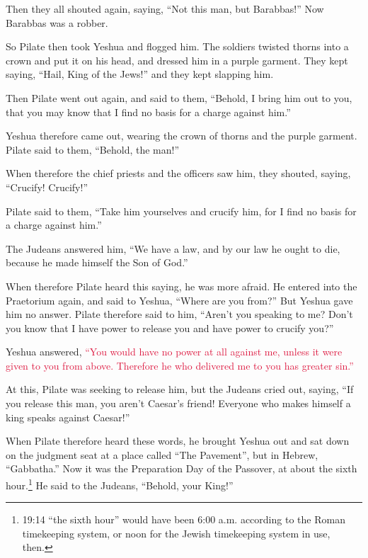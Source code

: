 \myverse{}Then they all shouted again, saying, “Not this man, but Barabbas!”
Now Barabbas was a robber.



 \myverse*{}So Pilate then took Yeshua and flogged him.
\myverse{}The soldiers twisted thorns into a crown and put it on his head, and dressed
him in a purple garment.
\myverse{}They kept saying, “Hail, King of the Jews!” and they kept slapping him.

\myverse{}Then Pilate went out again, and said to them, “Behold, I bring
him out to you, that you may know that I find no basis for a charge against him.”

\myverse{}Yeshua therefore came out, wearing the crown of thorns and the
purple garment. Pilate said to them, “Behold, the man!”

\myverse{}When therefore the chief priests and the officers saw him, they
shouted, saying, “Crucify! Crucify!”

Pilate said to them, “Take him yourselves and crucify him, for I find no basis for a charge
against him.”

\myverse{}The Judeans answered him, “We have a law, and by our law he ought
to die, because he made himself the Son of God.”

\myverse{}When therefore Pilate heard this saying, he was more afraid.
\myverse{}He entered into the Praetorium again, and said to Yeshua, “Where are you from?”
But Yeshua gave him no answer.
\myverse{}Pilate therefore said to him, “Aren’t you speaking to me? Don’t you know
that I have power to release you and have power to crucify you?”

\myverse{}Yeshua answered,
\textcolor{crimson}{“You would have no power at all against me, unless it were given to you from above. Therefore he who
	delivered me to you has greater sin.”}

\myverse{}At this, Pilate was seeking to release him, but the Judeans
cried out, saying, “If you release this man, you aren’t Caesar’s friend! Everyone who makes himself a
king speaks against Caesar!”

\myverse{}When Pilate therefore heard these words, he brought Yeshua out
and sat down on the judgment seat at a place called “The Pavement”, but in Hebrew, “Gabbatha.”
\myverse{}Now it was the Preparation Day of the Passover, at about the sixth hour.\footnote{19:14 “the sixth hour” would have been 6:00 a.m. according to the Roman timekeeping system, or noon
	for the Jewish timekeeping system in use, then.
} He said to the Judeans, “Behold, your King!”

